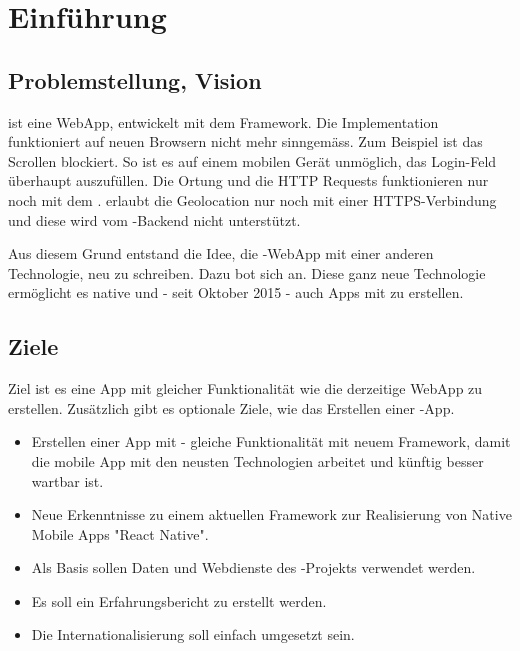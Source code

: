 \chapter{Einführung}
\label{tb-einfuehrung}

\section{Problemstellung, Vision}
\kort{} ist eine \gls{WebApp}, entwickelt mit dem  \gls{Framework}.
Die Implementation funktioniert auf neuen Browsern nicht mehr sinngemäss.
Zum Beispiel ist das Scrollen blockiert.
So ist es auf einem mobilen Gerät unmöglich, das Login-Feld überhaupt auszufüllen.
Die Ortung und die HTTP Requests funktionieren nur noch mit dem .
 erlaubt die Geolocation nur noch mit einer HTTPS-Verbindung und diese wird vom \kort{}-Backend nicht unterstützt.

Aus diesem Grund entstand die Idee, die \kort{}-\gls{WebApp} mit einer anderen Technologie, neu zu schreiben.
Dazu bot sich  an. 
Diese ganz neue Technologie ermöglicht es native  und - seit Oktober 2015 - auch  Apps mit  zu erstellen. 


\section{Ziele}
\label{tb-einfuehrung-ziele}
Ziel ist es eine  App mit gleicher Funktionalität wie die derzeitige \gls{WebApp} zu erstellen.
Zusätzlich gibt es optionale Ziele, wie das Erstellen einer -App.

\begin{itemize}
	\item Erstellen einer  App mit  - gleiche Funktionalität mit neuem Framework, damit die mobile App mit den neusten Technologien arbeitet und künftig besser wartbar ist.
	\item Neue Erkenntnisse zu einem aktuellen Framework zur Realisierung von Native Mobile Apps "React Native".
	\item Als Basis sollen Daten und Webdienste des -Projekts verwendet werden.
	\item Es soll ein Erfahrungsbericht zu  erstellt werden.
	\item Die Internationalisierung soll einfach umgesetzt sein.
\end{itemize}


